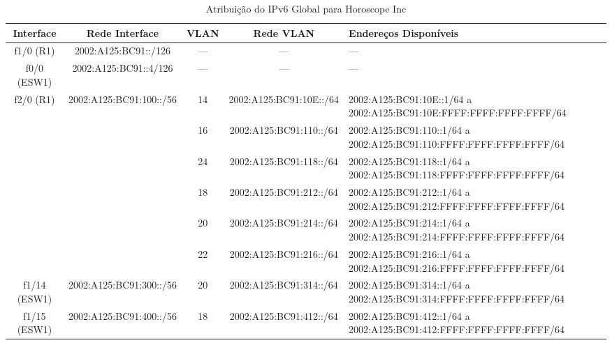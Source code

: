 \documentclass{article}
\begin{document}
\begin{table}[h!]
    \hspace*{-4.0cm}
    \centering
    \setlength{\tabcolsep}{2pt} %
    \renewcommand{\arraystretch}{1.3} %
    \begin{tabular}{|c|c|c|c|p{7.8cm}|} %
        \hline
        \textbf{Interface} & \textbf{Rede Interface} & \textbf{VLAN} & \textbf{Rede VLAN} & \textbf{Endereços Disponíveis} \\ \hline

        f1/0 (R1) & 2002:A125:BC91::/126 & --- & --- & --- \\ \hline
        
        f0/0 (ESW1) & 2002:A125:BC91::4/126 & --- & --- & --- \\ \hline
        
        \multirow{5}{*}{f2/0 (R1)} & \multirow{5}{*}{2002:A125:BC91:100::/56} & 14 & 2002:A125:BC91:10E::/64 & 2002:A125:BC91:10E::1/64 a 2002:A125:BC91:10E:FFFF:FFFF:FFFF:FFFF/64 \\ \cline{3-5} 
         & & 16 & 2002:A125:BC91:110::/64 & 2002:A125:BC91:110::1/64 a 2002:A125:BC91:110:FFFF:FFFF:FFFF:FFFF/64 \\ \cline{3-5}   
         & & 24 & 2002:A125:BC91:118::/64 & 2002:A125:BC91:118::1/64 a 2002:A125:BC91:118:FFFF:FFFF:FFFF:FFFF/64 \\ \hline
         
         \multirow{5}{*}{f1/13 (ESW1)} & \multirow{5}{*}{2002:A125:BC91:200::/56} & 18 & 2002:A125:BC91:212::/64 & 2002:A125:BC91:212::1/64 a 2002:A125:BC91:212:FFFF:FFFF:FFFF:FFFF/64 \\ \cline{3-5}   
         & & 20 & 2002:A125:BC91:214::/64 & 2002:A125:BC91:214::1/64 a 2002:A125:BC91:214:FFFF:FFFF:FFFF:FFFF/64 \\ \cline{3-5}   
         & & 22 & 2002:A125:BC91:216::/64 & 2002:A125:BC91:216::1/64 a 2002:A125:BC91:216:FFFF:FFFF:FFFF:FFFF/64 \\ \hline
        
        f1/14 (ESW1) & 2002:A125:BC91:300::/56 & 20 & 2002:A125:BC91:314::/64 & 2002:A125:BC91:314::1/64 a 2002:A125:BC91:314:FFFF:FFFF:FFFF:FFFF/64 \\ \hline
        
        f1/15 (ESW1) & 2002:A125:BC91:400::/56 & 18 & 2002:A125:BC91:412::/64 & 2002:A125:BC91:412::1/64 a 2002:A125:BC91:412:FFFF:FFFF:FFFF:FFFF/64 \\ \hline

    \end{tabular}
    \caption{Atribuição do IPv6 Global para Horoscope Inc}
\end{table}
\end{document}
